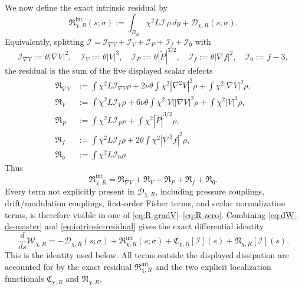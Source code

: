 \documentclass[11pt]{amsart}
\numberwithin{equation}{section}
\theoremstyle{plain}
\theoremstyle{definition}
\theoremstyle{remark}
\newcommand{\Wloc}{\mathcal W}
\newcommand{\Diss}{\mathcal D}
\begin{document}
We now define the exact intrinsic residual by
\begin{equation}\label{eq:intrinsic-residual}
	\mathfrak R_{\chi,R}^{\mathrm{int}}(s;\sigma)
	:=\int_{B_R}\chi^2 L\mathcal I\,\rho\,dy
	+\Diss_{\chi,R}(s;\sigma).
\end{equation}
Equivalently, splitting
\(\mathcal I=\mathcal I_{\nabla V}+\mathcal I_V+\mathcal I_P+\mathcal I_f+\mathcal I_0\)
with
\[
	\mathcal I_{\nabla V}:=\theta|\nabla V|^2,\quad
	\mathcal I_V:=\theta|V|^3,\quad
	\mathcal I_P:=\theta|\widetilde P|^{3/2},\quad
	\mathcal I_f:=\theta|\nabla f|^2,\quad
	\mathcal I_0:=f-3,
\]
the residual is the sum of the five displayed scalar defects
\begin{align}
	\mathfrak R_{\nabla V}
	&:=\int\chi^2 L\mathcal I_{\nabla V}\rho
	+2\nu\theta\int\chi^2|\nabla^2 V|^2\rho
	+\int\chi^2|\nabla V|^2\rho,\label{eq:R-gradV}\\
	\mathfrak R_V
	&:=\int\chi^2 L\mathcal I_V\rho
	+6\nu\theta\int\chi^2|V||\nabla V|^2\rho
	+\int\chi^2|V|^3\rho,\label{eq:R-V}\\
	\mathfrak R_P
	&:=\int\chi^2 L\mathcal I_P\rho
	+\int\chi^2|\widetilde P|^{3/2}\rho,\label{eq:R-P}\\
	\mathfrak R_f
	&:=\int\chi^2 L\mathcal I_f\rho
	+2\theta\int\chi^2|\nabla^2f|^2\rho,\label{eq:R-f}\\
	\mathfrak R_0
	&:=\int\chi^2 L\mathcal I_0\rho.\label{eq:R-zero}
\end{align}
Thus
\[
	\mathfrak R_{\chi,R}^{\mathrm{int}}
	=\mathfrak R_{\nabla V}+\mathfrak R_V+\mathfrak R_P+\mathfrak R_f+\mathfrak R_0.
\]
Every term not explicitly present in \(\Diss_{\chi,R}\), including pressure
couplings, drift/modulation couplings, first-order Fisher terms, and scalar
normalization terms, is therefore visible in one of
\eqref{eq:R-gradV}--\eqref{eq:R-zero}.  Combining
\eqref{eq:dW-ds-master} and \eqref{eq:intrinsic-residual} gives the exact
differential identity
\begin{equation}\label{eq:dW-ds-assembled}
	\frac{d}{ds}\Wloc_{\chi,R}
	=-\Diss_{\chi,R}(s;\sigma)
	+\mathfrak R_{\chi,R}^{\mathrm{int}}(s;\sigma)
	+\mathfrak C_{\chi,R}[\mathcal I](s)
	+\mathfrak N_{\chi,R}[\mathcal I](s).
\end{equation}
This is the identity used below.  All terms outside the displayed
dissipation are accounted for by the exact residual
\(\mathfrak R_{\chi,R}^{\mathrm{int}}\) and the two explicit localization
functionals \(\mathfrak C_{\chi,R}\) and \(\mathfrak N_{\chi,R}\).
\end{document}
